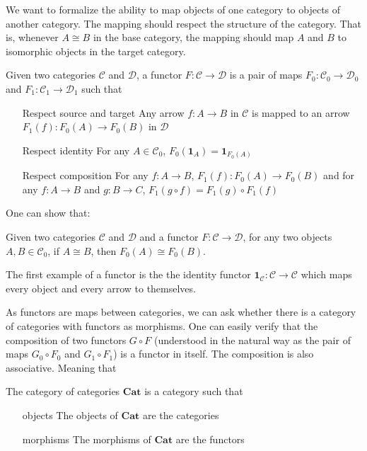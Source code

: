 We want to formalize the ability to map objects of one category to 
objects of another category.
The mapping should respect the structure of the category.
That is, whenever $A\cong B$ in the base category,
the mapping should map $A$ and $B$ to isomorphic objects in the 
target category.
\begin{definition}[Functor]
    Given two categories $\mathcal{C}$ and $\mathcal{D}$, a functor $F:\mathcal{C}\to\mathcal{D}$ is a pair
    of maps $F_0:\mathcal{C}_0\to\mathcal{D}_0$ and $F_1:\mathcal{C}_1\to\mathcal{D}_1$ such that
    \begin{itemize}
        \item[Respect source and target] Any arrow $f:A\to B$ in $\mathcal{C}$ is mapped to an 
        arrow $F_1(f):F_0(A)\to F_0(B)$ in $\mathcal{D}$
        \item[Respect identity] For any $A\in\mathcal{C}_0$, $F_0(\mathbf{1}_A)=\mathbf{1}_{F_0(A)}$
        \item[Respect composition] For any $f:A\to B$, $F_1(f):F_0(A)\to F_0(B)$
        and for any $f:A\to B$ and $g:B\to C$, $F_1(g\circ f)=F_1(g)\circ F_1(f)$
    \end{itemize}
\end{definition}
One can show that:
\begin{lemma}
    Given two categories 
    $\mathcal{C}$ and $\mathcal{D}$ and a 
    functor $F:\mathcal{C}\to\mathcal{D}$,
    for any two objects $A,B\in\mathcal{C}_0$,
    if $A\cong B$, then $F_0(A)\cong F_0(B)$.
\end{lemma}
The first example of a functor is the the identity functor $\mathbf{1}_{\mathcal{C}}:\mathcal{C}\to\mathcal{C}$
which maps every object and every arrow to themselves.

As functors are maps between categories, we can ask whether
there is a category of categories with functors as morphisms.
One can easily verify that the composition of two functors $G\circ F$
(understood in the natural way as the pair of maps $G_0\circ F_0$ and $G_1\circ F_1$) is a functor in itself.
The composition is also associative.
Meaning that
\begin{definition}
    The category of categories $\mathbf{Cat}$ is a category such that
    \begin{itemize}
        \item[objects] The objects of $\mathbf{Cat}$ are the categories
        \item[morphisms] The morphisms of $\mathbf{Cat}$ are the functors
    \end{itemize}
\end{definition}

